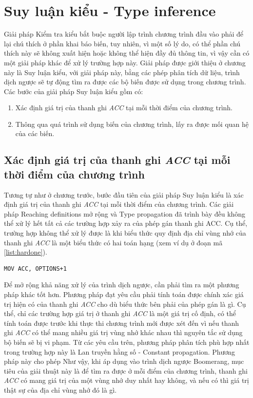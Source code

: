 \chapter{Suy luận kiểu - Type inference}
Giải pháp Kiểm tra kiểu bắt buộc người lập trình chương trình đầu vào phải để lại chú thích ở phần khai báo biến, tuy nhiên, vì một số lý do, có thể phần chú thích này sẽ không xuất hiện hoặc không thể hiện đầy đủ thông tin, vì vậy cần có một giải pháp khác để xử lý trường hợp này. Giải pháp được giới thiệu ở chương này là Suy luận kiểu, với giải pháp này, bằng các phép phân tích dữ liệu, trình dịch ngược sẽ tự động tìm ra được các bộ biến được sử dụng trong chương trình. Các bước của giải pháp Suy luận kiểu gồm có:
\begin{enumerate}
	\item Xác định giá trị của thanh ghi \textit{ACC} tại mỗi thời điểm của chương trình.
	\item Thông qua quá trình sử dụng biến của chương trình, lấy ra được mối quan hệ của các biến.
\end{enumerate}

\section{Xác định giá trị của thanh ghi \textit{ACC} tại mỗi thời điểm của chương trình}
Tương tự như ở chương trước, bước đầu tiên của giải pháp Suy luận kiểu là xác định giá trị của thanh ghi \textit{ACC} tại mỗi thời điểm của chương trình. Các giải pháp Reaching definitions mở rộng và Type propagation đã trình bày đều không thể xử lý hết tất cả các trường hợp xảy ra của phép gán thanh ghi ACC. Cụ thể, trường hợp không thể xử lý được là khi biểu thức quy định địa chỉ vùng nhớ của thanh ghi \textit{ACC} là một biểu thức có hai toán hạng (xem ví dụ ở đoạn mã \ref{list:hardone}). 
\begin{lstlisting}[caption={Trường hợp không thể xử lý được bằng các phương pháp phân tích dữ liệu trước},label={list:hardone}]
MOV ACC, OPTIONS+1
\end{lstlisting}
Để mở rộng khả năng xử lý của trình dịch ngược, cần phải tìm ra một phương pháp khác tốt hơn. Phương pháp đạt yêu cầu phải tính toán được chính xác giá trị hiện có của thanh ghi \textit{ACC} cho dù biểu thức bên phải của phép gán là gì. Cụ thể, chỉ các trường hợp giá trị ở thanh ghi \textit{ACC} là một giá trị cố định, có thể tính toán được trước khi thực thi chương trình mới được xét đến vì nếu thanh ghi \textit{ACC} có thể mang nhiều giá trị vùng nhớ khác nhau thì nguyên tắc sử dụng bộ biến sẽ bị vi phạm. Từ các yêu cầu trên, phương pháp phân tích phù hợp nhất trong trường hợp này là Lan truyền hằng số - Constant propagation. Phương pháp này cho phép 
Như vậy, khi áp dụng vào trình dịch ngược Boomerang, mục tiêu của giải thuật này là để tìm ra được ở mỗi điểm của chương trình, thanh ghi \textit{ACC} có mang giá trị của một vùng nhớ duy nhất hay không, và nếu có thì giá trị thật sự của địa chỉ vùng nhớ đó là gì.


